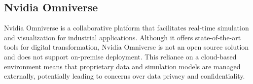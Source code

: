 \subsection{Nvidia Omniverse}
Nvidia Omniverse is a collaborative platform that facilitates real-time simulation and visualization for industrial applications. Although it offers state-of-the-art tools for digital transformation, Nvidia Omniverse is not an open source solution and does not support on-premise deployment. This reliance on a cloud-based environment means that proprietary data and simulation models are managed externally, potentially leading to concerns over data privacy and confidentiality.
